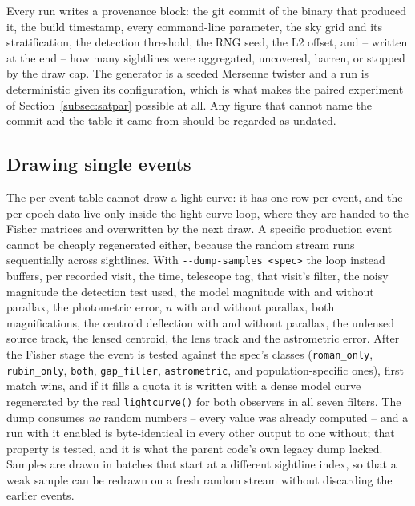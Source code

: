 \documentclass[english,10pt,a4paper]{article}
\begin{document}
	Every run writes a provenance block: the git commit of the binary that produced it, the build timestamp, every command-line parameter, the sky grid and its stratification, the detection threshold, the RNG seed, the L2 offset, and -- written at the end -- how many sightlines were aggregated, uncovered, barren, or stopped by the draw cap. The generator is a seeded Mersenne twister and a run is deterministic given its configuration, which is what makes the paired experiment of Section~\ref{subsec:satpar} possible at all. Any figure that cannot name the commit and the table it came from should be regarded as undated.

	\subsection{Drawing single events}
	\label{subsec:samples}

	The per-event table cannot draw a light curve: it has one row per event, and the per-epoch data live only inside the light-curve loop, where they are handed to the Fisher matrices and overwritten by the next draw. A specific production event cannot be cheaply regenerated either, because the random stream runs sequentially across sightlines. With \texttt{-{}-dump-samples <spec>} the loop instead buffers, per recorded visit, the time, telescope tag, that visit's filter, the noisy magnitude the detection test used, the model magnitude with and without parallax, the photometric error, $u$ with and without parallax, both magnifications, the centroid deflection with and without parallax, the unlensed source track, the lensed centroid, the lens track and the astrometric error. After the Fisher stage the event is tested against the spec's classes (\texttt{roman\_only}, \texttt{rubin\_only}, \texttt{both}, \texttt{gap\_filler}, \texttt{astrometric}, and population-specific ones), first match wins, and if it fills a quota it is written with a dense model curve regenerated by the real \texttt{lightcurve()} for both observers in all seven filters. The dump consumes \emph{no} random numbers -- every value was already computed -- and a run with it enabled is byte-identical in every other output to one without; that property is tested, and it is what the parent code's own legacy dump lacked. Samples are drawn in batches that start at a different sightline index, so that a weak sample can be redrawn on a fresh random stream without discarding the earlier events.
\end{document}
